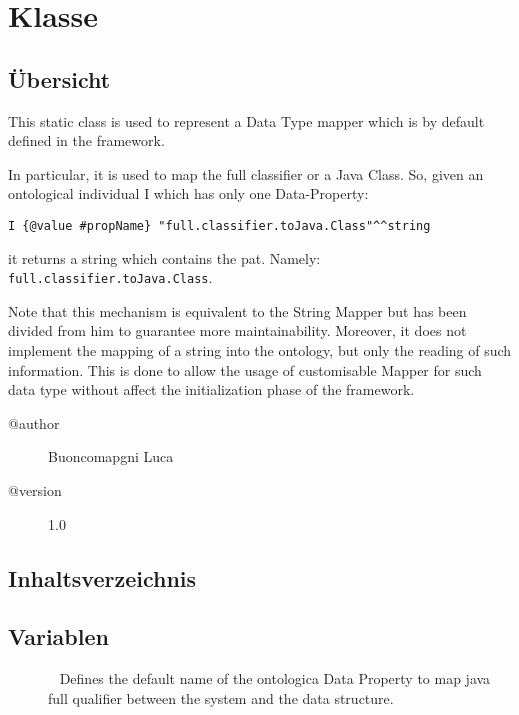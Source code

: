 
\section[NameMapper]{Klasse }\label{ontologyFramework.OFDataMapping.ReservatedDataType.NameMapper-class}
\subsection{Übersicht}
This static class is used to represent a Data Type mapper
 which is by default defined in the framework.
 
 In particular, it is used to map the full 
 classifier or a Java Class. So, given an ontological individual I
 which has only one Data-Property:\mbox{}\newline

 \verb!I {@value #propName} "full.classifier.toJava.Class"^^string!\mbox{}\newline

 it returns a string which contains the pat. Namely: 
 \verb!full.classifier.toJava.Class!.
 
 Note that this mechanism is equivalent to the String Mapper
 but has been divided from him to guarantee more maintainability.
 Moreover, it does not implement the mapping of a string into the 
 ontology, but only the reading of such information. This is done
 to allow the usage of customisable Mapper for such data type
 without affect the initialization phase of the framework.
\begin{description}
\item[@author] 
Buoncomapgni Luca
\item[@version] 
1.0
\end{description}
\subsection{Inhaltsverzeichnis}
\subsection{Variablen}
\begin{description}
\item[{\label{ontologyFramework.OFDataMapping.ReservatedDataType.NameMapper.NAME_propName}}]
~ Defines the default name of the ontologica Data Property
 to map java full qualifier between the system and the data structure.
\end{description}
